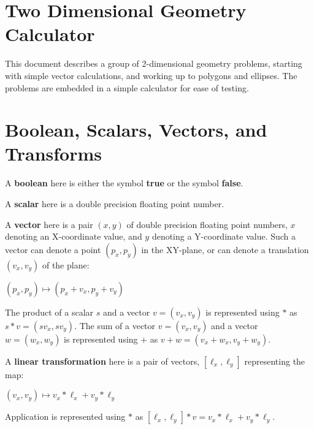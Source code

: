 \documentclass[12pt]{article}
\begin{document}
\newcommand{\header}[1]{\underline{\bf #1}}
\newcommand{\file}[1]{{\bf #1}}
\newcommand{\blankpage}{\newpage\vspace*{3.5in}%
    \centerline{\Large This Page is Intentionally Left Blank}}
\setlength{\parindent}{0.0in}
\setlength{\parskip}{1ex}
\newcommand{\key}[1]{{\bf #1}}
\newcommand{\TT}[1]{{\tt \bfseries #1}}
\newcommand{\EOL}{\penalty \exhyphenpenalty}
\newtheorem{definition}{Definition}[section]
\newtheorem{lemma}[definition]{Lemma}
\newtheorem{corollary}[definition]{Corollary}
\newtheorem{theorem}[definition]{Theorem}
\newenvironment{indpar}[1]%
    {\begin{list}{}{\setlength{\leftmargin}{#1}}\item[]}%
    {\end{list}}

\section{Two Dimensional Geometry Calculator}
This document describes a group of 2-dimensional geometry problems,
starting with simple vector calculations, and working up to polygons and
ellipses.
The problems are embedded in a simple calculator for ease of
testing.

\section{Boolean, Scalars, Vectors, and Transforms}
A \key{boolean} here is either the symbol \key{true} or the symbol \key{false}.

A \key{scalar} here is a double precision floating point number.

A \key{vector} here is a pair $(x,y)$ of double precision floating point
numbers, $x$ denoting an X-coordinate value, and $y$ denoting a
Y-coordinate value.  Such a vector can denote a point $(p_x,p_y)$ in the
XY-plane, or can denote a translation $(v_x,v_y)$ of the plane: \\
\centerline{$(p_x,p_y) \longmapsto (p_x+v_x,p_y+v_y)$}

The product of a scalar $s$ and a vector $v=(v_x,v_y)$ is represented using
$*$ as $s*v = (sv_x,sv_y)$.
The sum of a vector $v=(v_x,v_y)$ and a vector $w=(w_x,w_y)$ is
represented using $+$ as $v+w = (v_x+w_x,v_y+w_y)$.

A \key{linear transformation} here is a pair of vectors, $[\ell_x,\ell_y]$
representing the map:
\centerline{$(v_x,v_y) \longmapsto v_x*\ell_x+v_y*\ell_y$}
Application is represented using
$*$ as $[\ell_x,\ell_y]*v=v_x*\ell_x+v_y*\ell_y$.
\end{document}
